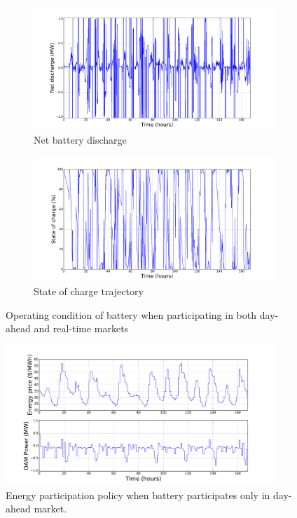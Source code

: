 \documentclass[11pt,twoside]{article}
\begin{document}
\begin{figure}[h!]
\begin{subfigure}{\textwidth}
\centering
\includegraphics[width=\linewidth]{Figures/Plots/fullproblem_stoch/netpower_fp_st.pdf} \caption{Net battery discharge}\label{fig:netpower_fp_st}
\end{subfigure}
\begin{subfigure}{\textwidth}
\centering
\includegraphics[width=\linewidth]{Figures/Plots/fullproblem_stoch/soc_fp_st.pdf} \caption{State of charge trajectory}\label{fig:soc_fp_st}
\end{subfigure}
\caption{Operating condition of battery when participating in both day-ahead and real-time markets}
\end{figure}
\FloatBarrier
\begin{figure}[h!]
\begin{center}
\includegraphics[width=4in]
{Figures/Plots/onlydam/Pdam_fp_st.pdf} \caption{Energy participation policy when battery participates only in day-ahead market.}\label{fig:Pdam_onlydam}\end{center}
\end{figure}
\end{document}

